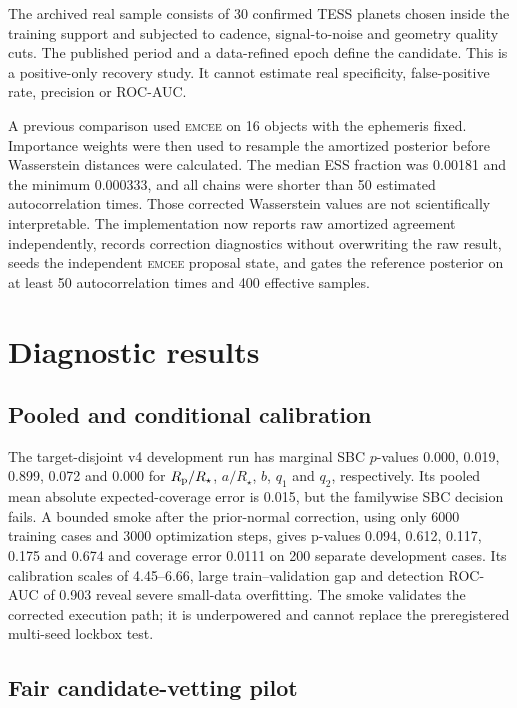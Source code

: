\documentclass[fleqn,usenatbib]{mnras}
\begin{document}
The archived real sample consists of 30 confirmed TESS planets chosen inside
the training support and subjected to cadence, signal-to-noise and geometry
quality cuts. The published period and a data-refined epoch define the candidate.
This is a positive-only recovery study. It cannot estimate real specificity,
false-positive rate, precision or ROC-AUC.

A previous comparison used \textsc{emcee} \citep{ForemanMackey2013} on 16
objects with the ephemeris fixed. Importance weights were then used to resample
the amortized posterior before Wasserstein distances were calculated. The median
ESS fraction was 0.00181 and the minimum 0.000333, and all chains were shorter
than 50 estimated autocorrelation times. Those corrected Wasserstein values are
not scientifically interpretable. The implementation now reports raw amortized
agreement independently, records correction diagnostics without overwriting the
raw result, seeds the independent \textsc{emcee} proposal state, and gates the
reference posterior on at least 50 autocorrelation times and 400 effective
samples.

\section{Diagnostic results}
\label{sec:results}

\subsection{Pooled and conditional calibration}

The target-disjoint v4 development run has marginal SBC $p$-values 0.000,
0.019, 0.899, 0.072 and 0.000 for $R_{\rm p}/R_\star$, $a/R_\star$, $b$,
$q_1$ and $q_2$, respectively. Its pooled mean absolute expected-coverage error
is 0.015, but the familywise SBC decision fails. A bounded smoke after the
prior-normal correction, using only 6000 training cases and 3000 optimization
steps, gives p-values 0.094, 0.612, 0.117, 0.175 and 0.674 and coverage error
0.0111 on 200 separate development cases. Its calibration scales of 4.45--6.66,
large train--validation gap and detection ROC-AUC of 0.903 reveal severe
small-data overfitting. The smoke validates the corrected execution path; it is
underpowered and cannot replace the preregistered multi-seed lockbox test.

\subsection{Fair candidate-vetting pilot}
\end{document}

